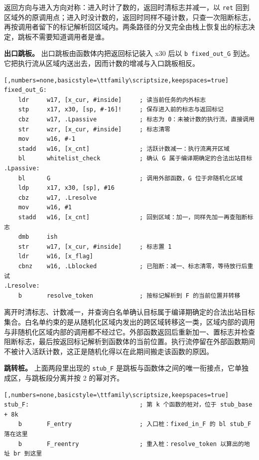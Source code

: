 返回方向与进入方向对称：进入时计了数的，返回时清标志并减一，以 \lstinline[breaklines=false]@ret@ 回到区域外的原调用点；进入时没计数的，返回时同样不碰计数，只查一次阻断标志，再按调用者留下的标记解析回区域内。两条路径的分叉完全由栈上恢复出的标志决定，跳板不需要知道调用者是谁。

\textbf{出口跳板。} 出口跳板由函数体内把返回标记装入 x30 后以 \lstinline[breaklines=false]@b fixed_out_G@ 到达。它把执行流从区域内送出去，因而计数的增减与入口跳板相反。

\begin{lstlisting}[,numbers=none,basicstyle=\ttfamily\scriptsize,keepspaces=true]
fixed_out_G:
    ldr     w17, [x_cur, #inside]     ; 读当前任务的内外标志
    stp     x17, x30, [sp, #-16]!     ; 保存进入前的标志与返回标记
    cbz     w17, .Lpassive            ; 标志为 0：未被计数的执行流，直接调用
    str     wzr, [x_cur, #inside]     ; 标志清零
    mov     w16, #-1
    stadd   w16, [x_cnt]              ; 活跃计数减一：执行流离开区域
    bl      whitelist_check           ; 确认 G 属于编译期确定的合法出站目标
.Lpassive:
    bl      G                         ; 调用外部函数，G 位于非随机化区域
    ldp     x17, x30, [sp], #16
    cbz     w17, .Lresolve
    mov     w16, #1
    stadd   w16, [x_cnt]              ; 回到区域：加一，同样先加一再查阻断标志
    dmb     ish
    str     w17, [x_cur, #inside]     ; 标志置 1
    ldr     w16, [x_flag]
    cbnz    w16, .Lblocked            ; 已阻断：减一、标志清零，等待放行后重试
.Lresolve:
    b       resolve_token             ; 按标记解析到 F 的当前位置并转移
\end{lstlisting}

离开时清标志、计数减一，并查询白名单确认目标属于编译期确定的合法出站目标集合。白名单约束的是从随机化区域内发出的跨区域转移这一类，区域内部的调用与非随机化区域内部的调用都不经过它。外部函数返回后重新加一、置标志并检查阻断标志，最后按返回标记解析到函数体的当前位置。执行流停留在外部函数期间不被计入活跃计数，这正是随机化得以在此期间搬走该函数的原因。

\textbf{跳转桩。} 上面两段里出现的 \lstinline[breaklines=false]@stub_F@ 是跳板与函数体之间的唯一衔接点，它单独成区，与跳板段分离并按 2 的幂对齐。

\begin{lstlisting}[,numbers=none,basicstyle=\ttfamily\scriptsize,keepspaces=true]
stub_F:                               ; 第 k 个函数的桩对，位于 stub_base + 8k
    b       F_entry                   ; 入口桩：fixed_in_F 的 bl stub_F 落在这里
    b       F_reentry                 ; 重入桩：resolve_token 以算出的地址 br 到这里
\end{lstlisting}

